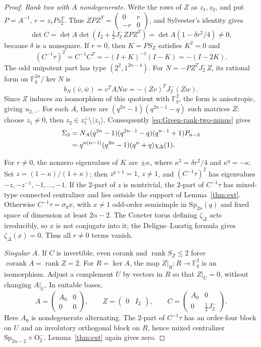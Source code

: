 \documentclass[12pt]{amsart}
\numberwithin{itemcounter}{subsection}
\theoremstyle{plain}
\theoremstyle{definition}
\theoremstyle{remark}
\numberwithin{equation}{section}
\def\bbF{\mathbb{F}}
\def\O{\mathrm{O}}
\def\Sp{\mathrm{Sp}}
\def\rank{{\operatorname{rank}\nolimits}}
\begin{document}
\begin{proof}
\smallskip
\noindent\emph{Rank two with $A$ nondegenerate.}
Write the rows of \(Z\) as \(z_1,z_2\), and put \(P=A^{-1}\),
\(r=z_1Pz_2^T\).  Thus
\(ZPZ^T=\left(\begin{smallmatrix}0&r\\-r&0\end{smallmatrix}\right)\),
and Sylvester's identity gives
\[
 \det C=\det A\det\left(I_2+\tfrac12J_2^-ZPZ^T\right)
       =\det A(1-\delta r^2/4)\ne0,
\]
because \(\delta\) is a nonsquare.
If \(r=0\), then \(K=PS_Z\) satisfies \(K^2=0\) and
\[
 (C^{-1}\tau)^2=C^{-1}C^T=-(I+K)^{-1}(I-K)=-(I-2K).
\]
The odd unipotent part has type \((2^2,1^{2n-4})\).  For
\(N=-PZ^TJ_2^-Z\), its rational form on \(\bbF_q^{2n}/\ker N\) is
\[
 b_N(\bar v,\bar w)=v^TANw=-(Zv)^TJ_2^-(Zw).
\]
Since \(Z\) induces an isomorphism of this quotient with \(\bbF_q^2\),
the form is anisotropic, giving \(u_{2,-}\).
For each \(A\), there are \((q^{2n}-1)(q^{2n-1}-q)\) such matrices
\(Z\): choose \(z_1\ne0\), then
\(z_2\in z_1^\perp\setminus\langle z_1\rangle\).
Consequently \eqref{eq:Green-rank-two-minus} gives
\begin{align}
\Sigma_2
&=N_A(q^{2n}-1)(q^{2n-1}-q)
  (q^{n-1}+1)P_{n-2}\notag\\
&=q^{n(n-1)}(q^{2n}-1)(q^n+q)
  \chi_\Delta(1).
\label{eq:Sigma2}
\end{align}

For \(r\ne0\), the nonzero eigenvalues of \(K\) are \(\pm\kappa\),
where \(\kappa^2=\delta r^2/4\) and \(\kappa^q=-\kappa\).
Set \(z=(1-\kappa)/(1+\kappa)\); then \(z^{q+1}=1\), \(z\ne1\),
and \((C^{-1}\tau)^2\) has eigenvalues
\(-z,-z^{-1},-1,\ldots,-1\).
If the \(2\)-part of \(z\) is nontrivial, the \(2\)-part of
\(C^{-1}\tau\) has mixed-type connected centralizer and lies outside the
support of Lemma~\ref{thm:ext}.
Otherwise \(C^{-1}\tau=\sigma_0x\), with \(x\ne1\) odd-order semisimple
in \(\Sp_{2n}(q)\) and fixed space of dimension at least \(2n-2\).
The Coxeter torus defining \(\zeta_\Delta\) acts irreducibly, so \(x\)
is not conjugate into it; the Deligne--Lusztig formula gives
\(\zeta_\Delta(x)=0\).  Thus all \(r\ne0\) terms vanish.

\smallskip
\noindent\emph{Singular $A$.}
If \(C\) is invertible, even corank and \(\rank S_Z\le2\) force
\(\operatorname{corank}A=\rank Z=2\).
For \(R=\ker A\), the map \(Z|_R:R\to\bbF_q^2\) is an isomorphism.
Adjust a complement \(U\) by vectors in \(R\) so that \(Z|_U=0\),
without changing \(A|_U\).  In suitable bases,
\[
 A=\begin{pmatrix}A_0&0\\0&0\end{pmatrix},\qquad
 Z=\begin{pmatrix}0&I_2\end{pmatrix},\qquad
 C=\begin{pmatrix}A_0&0\\0&\frac12J_2^-\end{pmatrix}.
\]
Here \(A_0\) is nondegenerate alternating.  The \(2\)-part of
\(C^{-1}\tau\) has an order-four block on \(U\) and an involutory
orthogonal block on \(R\), hence mixed centralizer
\(\Sp_{2n-2}\times\O^-_2\).  Lemma~\ref{thm:ext} again gives zero.


\end{proof}
\end{document}
